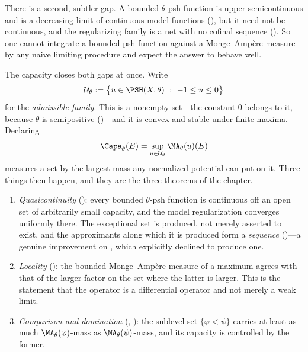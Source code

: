 There is a second, subtler gap.  A bounded \(\theta\)-psh function is upper
semicontinuous and is a decreasing limit of continuous model functions
(), but it need not be continuous,
and the regularizing family is a net with no cofinal sequence
().  So one cannot integrate a bounded psh
function against a Monge--Amp\`ere measure by any naive limiting procedure and
expect the answer to behave well.

The capacity closes both gaps at once.  Write
\begin{equation}
\label{eq:ch25-admissible}
 \mathcal U_\theta
 :=\bigl\{u\in\PSH(X,\theta)\ :\ -1\leq u\leq0\bigr\}
\end{equation}
for the \emph{admissible family}.  This is a nonempty set---the constant
\(0\) belongs to it, because \(\theta\) is semipositive
()---and it is convex and stable under finite
maxima.  Declaring
\[
              \Capa_\theta(E)=\sup_{u\in\mathcal U_\theta}\MA_\theta(u)(E)
\]
measures a set by the largest mass any normalized potential can put on it.
Three things then happen, and they are the three theorems of the chapter.

\begin{enumerate}
\item\label{itm:ch25-plan:qc}
 \emph{Quasicontinuity} (): every bounded
 \(\theta\)-psh function is continuous off an open set of arbitrarily small
 capacity, and the model regularization converges uniformly there.  The
 exceptional set is produced, not merely asserted to exist, and the
 approximants along which it is produced form a \emph{sequence}
 ()---a genuine improvement on
 , which explicitly declined
 to produce one.
\item\label{itm:ch25-plan:loc}
 \emph{Locality} (): the bounded
 Monge--Amp\`ere measure of a maximum agrees with that of the larger factor
 on the set where the latter is larger.  This is the statement that the
 operator is a differential operator and not merely a weak limit.
\item\label{itm:ch25-plan:cmp}
 \emph{Comparison and domination}
 (,
 ): the sublevel set
 \(\{\varphi<\psi\}\) carries at least as much \(\MA_\theta(\varphi)\)-mass
 as \(\MA_\theta(\psi)\)-mass, and its capacity is controlled by the former.
\end{enumerate}

